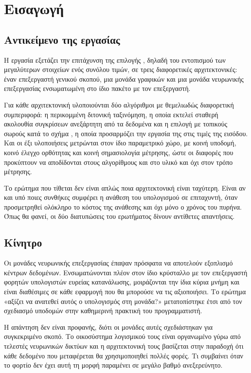 \chapter{Εισαγωγή}
\label{ch:intro}

\section{Αντικείμενο της εργασίας}
\label{sec:intro-scope}

Η εργασία εξετάζει την επιτάχυνση της επιλογής , δηλαδή του
εντοπισμού των  μεγαλύτερων στοιχείων ενός συνόλου  τιμών, σε τρεις
διαφορετικές αρχιτεκτονικές: έναν επεξεργαστή γενικού σκοπού, μια μονάδα
γραφικών και μια μονάδα νευρωνικής επεξεργασίας ενσωματωμένη στο ίδιο πακέτο με
τον επεξεργαστή.

Για κάθε αρχιτεκτονική υλοποιούνται δύο αλγόριθμοι με θεμελιωδώς διαφορετική
συμπεριφορά: η περικομμένη διτονική ταξινόμηση, η οποία εκτελεί σταθερή
ακολουθία συγκρίσεων ανεξάρτητη από τα δεδομένα και η επιλογή με τοπικούς
σωρούς κατά το σχήμα , η οποία προσαρμόζει την εργασία της στις
τιμές της εισόδου. Και οι έξι υλοποιήσεις μετρώνται στον ίδιο παραμετρικό χώρο,
με κοινή υποδομή, κοινό έλεγχο ορθότητας και κοινή σημασιολογία μέτρησης, ώστε οι
διαφορές που προκύπτουν να αποδίδονται στους αλγορίθμους και στο υλικό και όχι
στον τρόπο μέτρησης.

Το ερώτημα που τίθεται δεν είναι απλώς ποια αρχιτεκτονική είναι ταχύτερη. Είναι
αν και υπό ποιες συνθήκες συμφέρει η ανάθεση του υπολογισμού σε επιταχυντή, όταν
προσμετρηθεί ολόκληρο το κόστος της ανάθεσης και όχι μόνο ο χρόνος του πυρήνα.
Όπως θα φανεί, οι δύο διατυπώσεις του ερωτήματος δίνουν αντίθετες απαντήσεις.

\section{Κίνητρο}
\label{sec:intro-motivation}

Οι μονάδες νευρωνικής επεξεργασίας έπαψαν πρόσφατα να αποτελούν εξοπλισμό
κέντρων δεδομένων. Ενσωματώνονται πλέον στον ίδιο κρύσταλλο με τον επεξεργαστή
φορητών υπολογιστών ευρείας κατανάλωσης, μοιράζονται την ίδια κύρια μνήμη και
είναι διαθέσιμες σε κάθε εφαρμογή που θα μπορούσε να τις αξιοποιήσει. Το ερώτημα
«αξίζει να ανατεθεί αυτός ο υπολογισμός στη μονάδα?» μετατοπίστηκε έτσι από τον
σχεδιασμό υποδομών στην καθημερινή πρακτική του προγραμματιστή.

Η απάντηση δεν είναι προφανής, διότι οι μονάδες αυτές σχεδιάστηκαν για
συγκεκριμένο σκοπό. Το οικοσύστημα λογισμικού τους είναι οργανωμένο γύρω από
τελεστές νευρωνικών δικτύων και η αρχιτεκτονική τους βασίζεται στην παραδοχή
ότι κάθε δεδομένο που μεταφέρεται θα χρησιμοποιηθεί πολλές φορές. Τι συμβαίνει
όταν το φορτίο δεν έχει αυτή τη μορφή παραμένει σε μεγάλο βαθμό ανεξερεύνητο.

